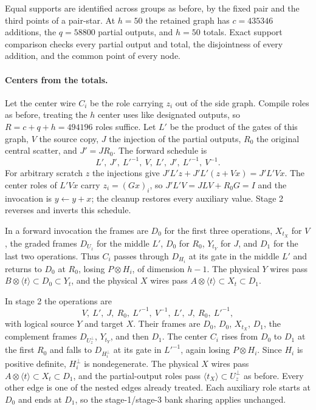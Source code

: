 Equal supports are identified across groups as before, by the fixed pair and
the third points of a pair-star. At $h=50$ the retained graph has
$c=435346$ additions, the $q=58800$ partial outputs, and $h=50$ totals.
Exact support comparison checks every partial output and total, the
disjointness of every addition, and the common point of every node.

\paragraph{Centers from the totals.} Let the center wire $C_i$ be the role
carrying $z_i$ out of the side graph. Compile roles as before, treating the
$h$ center uses like designated outputs, so $R=c+q+h=494196$ roles suffice.
Let $L'$ be the product of the gates of this graph, $V$ the source copy, $J$
the injection of the partial outputs, $R_0$ the original central scatter,
and $J'=JR_0$. The forward schedule is
\[
 L',\ J',\ L'^{-1},\ V,\ L',\ J',\ L'^{-1},\ V^{-1}.
\]
For arbitrary scratch $z$ the injections give $J'L'z+J'L'(z+Vx)=J'L'Vx$.
The center roles of $L'Vx$ carry $z_i=(Gx)_i$, so $J'L'V=JLV+R_0G=I$ and the
invocation is $y\gets y+x$; the cleanup restores every auxiliary value.
Stage 2 reverses and inverts this schedule.

In a forward invocation the frames are $D_0$ for the first three operations,
$X_{t_X}$ for $V$, the graded frames $D_{U_z}$ for the middle $L'$, $D_0$ for
$R_0$, $Y_{t_Y}$ for $J$, and $D_1$ for the last two operations. Thus $C_i$
passes through $D_{H_i}$ at its gate in the middle $L'$ and returns to $D_0$
at $R_0$, losing $P\otimes H_i$, of dimension $h-1$. The physical $Y$ wires
pass $B\otimes\langle t\rangle\subset D_0\subset Y_t$, and the physical $X$
wires pass $A\otimes\langle t\rangle\subset X_t\subset D_1$.

In stage 2 the operations are
\[
 V,\ L',\ J,\ R_0,\ L'^{-1},\ V^{-1},\ L',\ J,\ R_0,\ L'^{-1},
\]
with logical source $Y$ and target $X$. Their frames are $D_0$, $D_0$,
$X_{t_X}$, $D_1$, the complement frames $D_{U_z^\perp}$, $Y_{t_Y}$, and then
$D_1$. The center $C_i$ rises from $D_0$ to $D_1$ at the first $R_0$ and
falls to $D_{H_i^\perp}$ at its gate in $L'^{-1}$, again losing
$P\otimes H_i$. Since $H_i$ is positive definite, $H_i^\perp$ is
nondegenerate. The physical $X$ wires pass
$A\otimes\langle t\rangle\subset X_t\subset D_1$, and the partial-output
roles pass $\langle t_X\rangle\subset U_z^\perp$ as before. Every other edge is
one of the nested edges already treated. Each auxiliary role starts at $D_0$
and ends at $D_1$, so the stage-1/stage-3 bank sharing applies unchanged.

